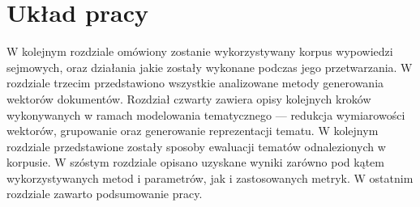 \section{Układ pracy}
	W kolejnym rozdziale omówiony zostanie wykorzystywany korpus wypowiedzi sejmowych,
		oraz działania jakie zostały wykonane podczas jego przetwarzania.
	W rozdziale trzecim przedstawiono wszystkie analizowane metody generowania wektorów dokumentów.
	Rozdział czwarty zawiera opisy kolejnych kroków wykonywanych w ramach modelowania tematycznego
		--- redukcja wymiarowości wektorów, grupowanie oraz generowanie reprezentacji tematu.
	W kolejnym rozdziale przedstawione zostały sposoby ewaluacji tematów odnalezionych w korpusie.
	W szóstym rozdziale opisano uzyskane wyniki zarówno pod kątem wykorzystywanych metod i parametrów, jak i zastosowanych metryk.
	W ostatnim rozdziale zawarto podsumowanie pracy.